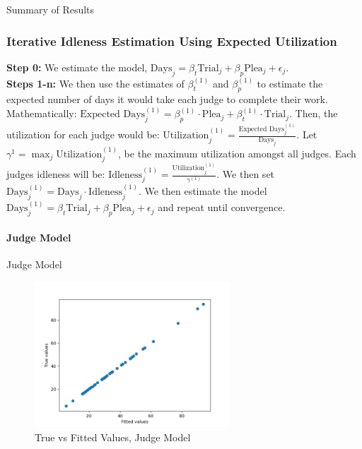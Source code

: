 \documentclass[11pt, oneside]{article}   	%
\theoremstyle{ModifiedStyle}
\begin{document}
		\begin{table}[H]
	    \centering
	    \caption{Summary of Results}
			\label{iterative-results}
	    
	  \end{table}

	  \subsubsection{Iterative Idleness Estimation Using Expected Utilization}
			\textbf{Step 0:} We estimate the model, $\text{Days}_j = \beta_t\text{Trial}_j + \beta_p\text{Plea}_j +\epsilon_j$. \\

			\noindent \textbf{Steps 1-n:} We then use the estimates of $\beta^{(1)}_t$ and $\beta^{(1)}_p$ to estimate the expected number
			of days it would take each judge to complete their work. Mathematically: $\text{Expected Days}^{(1)}_j = \beta^{(1)}_p \cdot \text{Plea}_j + \beta^{(1)}_t \cdot \text{Trial}_j$. Then, the utilization for each judge would be: $\text{Utilization}^{(1)}_j = \frac{\text{Expected Days}^{(1)}_j}{\text{Days}_j}$. Let $\gamma^1 = \max_j \text{Utilization}^{(1)}_j$, be the maximum utilization amongst all judges. Each judges idleness will be: $\text{Idleness}^{(1)}_j = \frac{\text{Utilization}^{(1)}_j}{\gamma^{(1)}}$. We then set $\text{Days}^{(1)}_j = \text{Days}_j \cdot \text{Idleness}^{(1)}_j$. We then estimate the model $\text{Days}^{(1)}_j = \beta_t\text{Trial}_j + \beta_p\text{Plea}_j +\epsilon_j$ and repeat until convergence.

			\paragraph{Judge Model}

				\begin{table}[H]
					\centering
					\caption{Judge Model}
					
				\end{table}

				\begin{figure}[H]
					\centering
					\includegraphics[width=0.65\textwidth]{../../output/figures/Exploration/fit_utilization_JudgeID}
					\caption{True vs Fitted Values, Judge Model}
				\end{figure}
\end{document}
